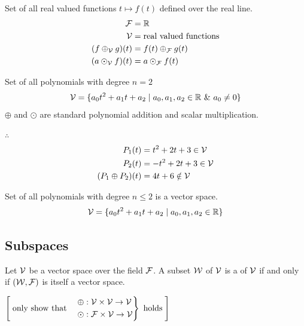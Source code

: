 \begin{example}
Set of all real valued functions $t\mapsto f(t)$ defined over the real line.
\begin{align*}
\mathcal{F} &= \mathbb{R}\\
\mathcal{V} &= \text{real valued functions}\\
(f\oplus_{\mathcal{V}} g)(t) &= f(t)\oplus_{\mathcal{F}} g(t)\\
(a\odot_{\mathcal{V}} f)(t) &= a\odot_{\mathcal{F}} f(t)
\end{align*}
\end{example}

\begin{example}
Set of all polynomials with degree $n=2$
\[ \mathcal{V} = \{a_0t^2+a_1t+a_2 \mid a_0,a_1,a_2\in\mathbb{R} \ \&\ a_0\neq0\} \]
$\oplus$ and $\odot$ are standard polynomial addition and scalar multiplication.

$\therefore$ 
\begin{align*}
P_1(t) &= t^2+2t+3 \in\mathcal{V}\\
P_2(t) &= -t^2+2t+3 \in\mathcal{V}\\
(P_1\oplus P_2)(t) &= 4t+6\notin\mathcal{V}
\end{align*}
\end{example}

\begin{example}
Set of all polynomials with degree $n\le2$ is a vector space.
\[ \mathcal{V} = \{a_0t^2+a_1t+a_2 \mid a_0,a_1,a_2\in\mathbb{R}\} \]
\end{example}

\subsection{Subspaces}\label{ss:subspaces}
\begin{definition}
Let $\mathcal{V}$ be a vector space over the field $\mathcal{F}$. A subset $\mathcal{W}$ of $\mathcal{V}$ is a  of $\mathcal{V}$ if and only if $(\mathcal{W},\mathcal{F})$ is itself a vector space.
\end{definition}
\begin{center}
\qquad
$\left[\;\text{only show that}\quad \left.\begin{aligned}\oplus&: \mathcal{V}\times\mathcal{V}\to\mathcal{V}\\ \odot&: \mathcal{F}\times\mathcal{V}\to\mathcal{V}\end{aligned}\right\}\ \text{holds}\;\right]$
\end{center}

